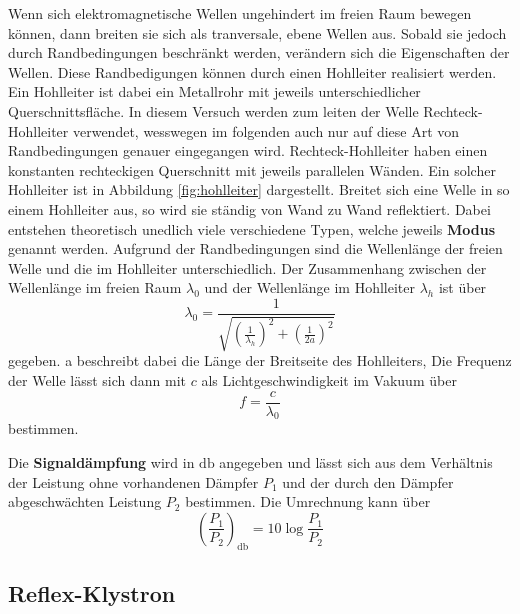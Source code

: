 Wenn sich elektromagnetische Wellen ungehindert im freien Raum bewegen können, dann breiten sie sich als tranversale, ebene Wellen aus. 
Sobald sie jedoch durch Randbedingungen beschränkt werden, verändern sich die Eigenschaften der Wellen. Diese Randbedigungen können durch einen Hohlleiter realisiert werden. Ein Hohlleiter ist dabei ein Metallrohr mit jeweils unterschiedlicher Querschnittsfläche. In diesem Versuch werden zum leiten der Welle Rechteck-Hohlleiter verwendet, wesswegen im folgenden auch nur auf diese Art von Randbedingungen genauer eingegangen wird. Rechteck-Hohlleiter haben einen konstanten rechteckigen Querschnitt mit jeweils parallelen Wänden. Ein solcher Hohlleiter ist in Abbildung \ref{fig:hohlleiter} dargestellt.
Breitet sich eine Welle in so einem Hohlleiter aus, so wird sie ständig von Wand zu Wand reflektiert. Dabei entstehen theoretisch unedlich viele verschiedene Typen, welche jeweils \textbf{Modus} genannt werden. Aufgrund der Randbedingungen sind die Wellenlänge der freien Welle und die im Hohlleiter unterschiedlich. Der Zusammenhang zwischen der Wellenlänge im freien Raum $\lambda_0$ und der Wellenlänge im Hohlleiter $\lambda_h$ ist über 
\begin{equation}
    \lambda_0 = \frac{1}{\sqrt{\left(\frac{1}{\lambda_h}\right)^2+\left(\frac{1}{2a}\right)^2}}
\end{equation}
gegeben. a beschreibt dabei die Länge der Breitseite des Hohlleiters,
Die Frequenz der Welle lässt sich dann mit $c$ als Lichtgeschwindigkeit im Vakuum über
\begin{equation}
    \label{eqn:f}
    f = \frac{c}{\lambda_0}
\end{equation}
bestimmen.

Die \textbf{Signaldämpfung} wird in $\si{\decibel}$ angegeben und lässt sich aus dem Verhältnis der Leistung ohne vorhandenen Dämpfer $P_1$ und der durch den Dämpfer abgeschwächten Leistung $P_2$ bestimmen.
Die Umrechnung kann über
\begin{equation}
    \left(\frac{P_1}{P_2}\right)_{\si{\decibel}} = 10 \log\frac{P_1}{P_2}
\end{equation}

\subsection{Reflex-Klystron}



